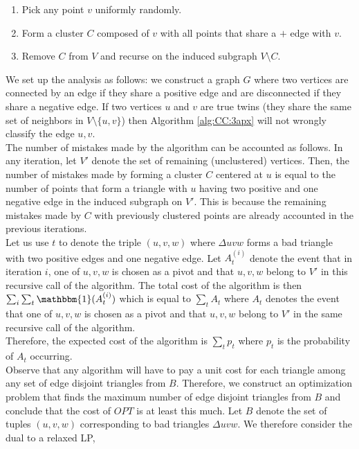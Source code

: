 \begin{algorithm} \label{alg:CC:3apx}
\begin{enumerate}
    \item Pick any point $v$ uniformly randomly.
    \item Form a cluster $C$ composed of $v$ with all points that share a $+$ edge with $v$.
    \item Remove $C$ from $V$ and recurse on the induced subgraph $V \setminus C$.
\end{enumerate}
\end{algorithm}

We set up the analysis as follows: we construct a graph $G$ where two vertices are connected by an edge if they share a positive edge and are disconnected if they share a negative edge. If two vertices $u$ and $v$ are true twins (they share the same set of neighbors in $V \setminus \{ u,v \}$) then Algorithm \ref{alg:CC:3apx} will not wrongly classify the edge $u,v$.\\

\noindent The number of mistakes made by the algorithm can be accounted as follows. In any iteration, let $V'$ denote the set of remaining (unclustered) vertices. Then, the number of mistakes made by forming a cluster $C$ centered at $u$ is equal to the number of points that form a triangle with $u$ having two positive and one negative edge in the induced subgraph on $V'$. This is because the remaining mistakes made by $C$ with previously clustered points are already accounted in the previous iterations.\\

\noindent Let us use $t$ to denote the triple $(u,v,w)$ where $\Delta uvw$ forms a bad triangle with two positive edges and one negative edge. Let $A_t^{(i)}$ denote the event that in iteration $i$, one of $u,v,w$ is chosen as a pivot and that $u,v,w$ belong to $V'$ in this recursive call of the algorithm. The total cost of the algorithm is then $\sum_i \sum_t \mathbbm{1} (A_t^{(i)})$ which is equal to $\sum_t A_t$ where $A_t$ denotes the event that one of $u,v,w$ is chosen as a pivot and that $u,v,w$ belong to $V'$ in the same recursive call of the algorithm.\\

\noindent Therefore, the expected cost of the algorithm is $\sum_t p_t$ where $p_t$ is the probability of $A_t$ occurring.\\

    \noindent Observe that any algorithm will have to pay a unit cost for each triangle among any set of edge disjoint triangles from $B$. Therefore, we construct an optimization problem that finds the maximum number of edge disjoint triangles from $B$ and conclude that the cost of $OPT$ is at least this much. Let $B$ denote the set of tuples $(u,v,w)$ corresponding to bad triangles $\Delta uvw$. We therefore consider the dual to a relaxed LP,

